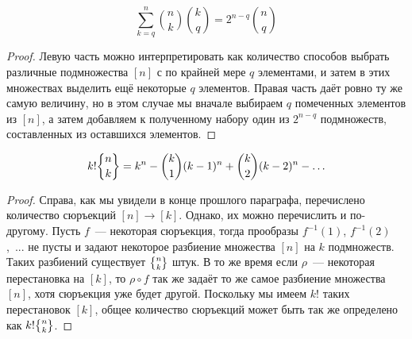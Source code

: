 \begin{thm}
$$\sum_{k=q}^n{n\choose k}{k\choose q} = 2^{n-q}{n\choose q}$$
\end{thm}
\begin{proof}
Левую часть можно интерпретировать как количество способов выбрать различные подмножества $[n]$ с по крайней мере $q$ элементами, и затем в этих множествах выделить ещё некоторые $q$ элементов. Правая часть даёт ровно ту же самую величину, но в этом случае мы вначале выбираем $q$ помеченных элементов из $[n]$, а затем добавляем к полученному набору один из $2^{n-q}$ подмножеств, составленных из оставшихся элементов.
\end{proof}

\begin{thm}
$$k!\sstirling{n}{k} = k^n - {k \choose 1}(k-1)^n + {k\choose 2}(k-2)^n -\ldots$$
\end{thm}
\begin{proof}
Справа, как мы увидели в конце прошлого параграфа, перечислено количество сюръекций $[n]\to[k]$. Однако, их можно перечислить и по-другому. Пусть $f$~— некоторая сюръекция, тогда прообразы $f^{-1}(1)$, $f^{-1}(2)$,~... не пусты и задают некоторое разбиение множества $[n]$ на $k$ подмножеств. Таких разбиений существует $\sstirling{n}{k}$ штук. В то же время если $\rho$~— некоторая перестановка на $[k]$, то $\rho\circ f$ так же задаёт то же самое разбиение множества $[n]$, хотя сюръекция уже будет другой. Поскольку мы имеем $k!$ таких перестановок $[k]$, общее количество сюръекций может быть так же определено как $k!\sstirling{n}{k}$.
\end{proof}

